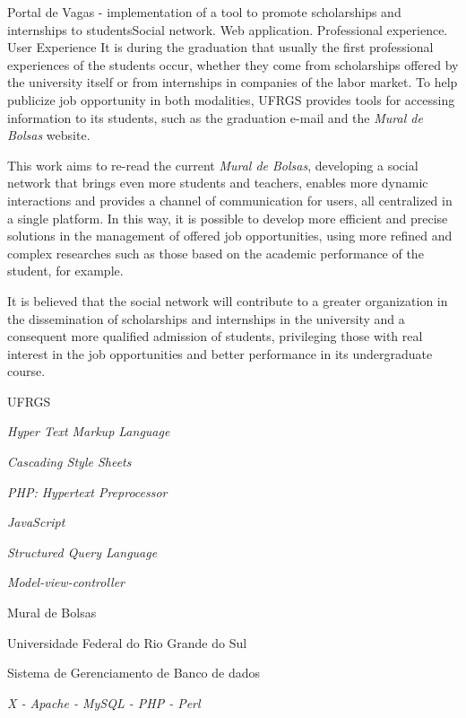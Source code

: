 \documentclass[cic,tc]{iiufrgs}
\begin{document}
\begin{englishabstract}{
Portal de Vagas - implementation of a tool to promote scholarships and internships to students}{Social network.  Web application. Professional experience. User Experience}
    It is during the graduation that usually the first professional experiences of the students occur, whether they come from scholarships offered by the university itself or from internships in companies of the labor market. To help publicize job opportunity in both modalities, UFRGS provides tools for accessing information to its students, such as the graduation e-mail and the \textit{Mural de Bolsas} website.
    
    This work aims to re-read the current \textit{Mural de Bolsas}, developing a social network that brings even more students and teachers, enables more dynamic interactions and provides a channel of communication for users, all centralized in a single platform. In this way, it is possible to develop more efficient and precise solutions in the management of offered job opportunities, using more refined and complex researches such as those based on the academic performance of the student, for example.

    It is believed that the social network will contribute to a greater organization in the dissemination of scholarships and internships in the university and a consequent more qualified admission of students, privileging those with real interest in the job opportunities and better performance in its undergraduate course.

\end{englishabstract}

\listoffigures

\listoftables

\begin{listofabbrv}{UFRGS}
    \item[HTML] \textit{Hyper Text Markup Language}
    \item[CSS] \textit{Cascading Style Sheets}
    \item[PHP] \textit{PHP: Hypertext Preprocessor}
    \item[JS] \textit{JavaScript}
    \item[SQL] \textit{Structured Query Language}
    \item[MVC] \textit{Model-view-controller}
    \item[MB] Mural de Bolsas
    \item[UFRGS] Universidade Federal do Rio Grande do Sul
    \item[SGBD] Sistema de Gerenciamento de Banco de dados
    \item[XAMPP] \textit{X - Apache - MySQL - PHP - Perl}
\end{listofabbrv}
\end{document}
